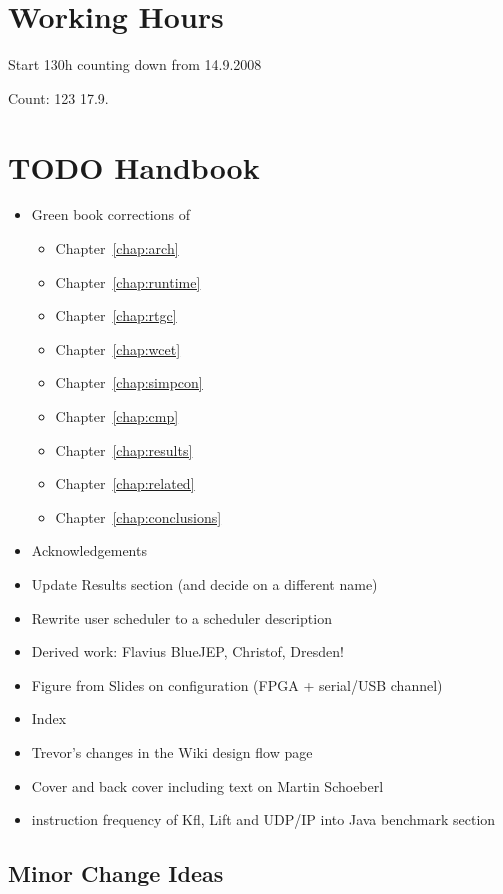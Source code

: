 \section{Working Hours}

Start 130h counting down from 14.9.2008

Count: 123 17.9.

\section{TODO Handbook}

\begin{itemize}
  \item Green book corrections of
  \begin{itemize}
    \item Chapter~\ref{chap:arch}
    \item Chapter~\ref{chap:runtime}
    \item Chapter~\ref{chap:rtgc}
    \item Chapter~\ref{chap:wcet}
    \item Chapter~\ref{chap:simpcon}
    \item Chapter~\ref{chap:cmp}
    \item Chapter~\ref{chap:results}
    \item Chapter~\ref{chap:related}
    \item Chapter~\ref{chap:conclusions}
  \end{itemize}

    \item Acknowledgements
    \item Update Results section (and decide on a different name)
    \item Rewrite user scheduler to a scheduler description
    \item Derived work: Flavius BlueJEP, Christof, Dresden!
    \item Figure from Slides on configuration (FPGA + serial/USB
    channel)
    \item Index
    \item Trevor's changes in the Wiki design flow page
    \item Cover and back cover including text on Martin Schoeberl
    \item instruction frequency of Kfl, Lift and UDP/IP into Java
        benchmark section
\end{itemize}

\subsection{Minor Change Ideas}

